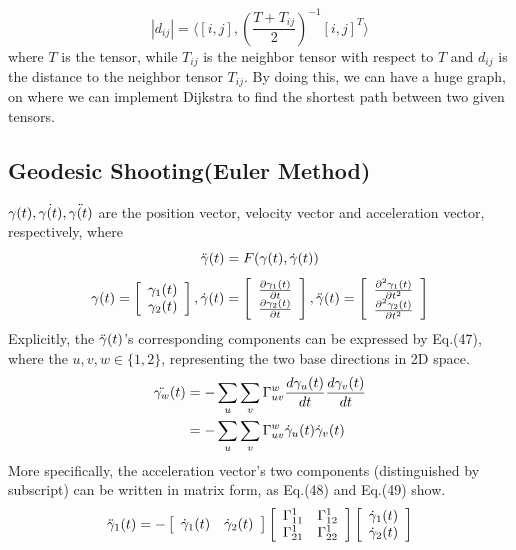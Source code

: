 \documentclass{article}
\theoremstyle{definition}
\theoremstyle{plain}
\begin{document}
\begin{equation}
    |d_{ij}|=\langle[i,j],\left(\frac{T+T_{ij}}{2}\right)^{-1}[i,j]^T\rangle
\end{equation}
where $T$ is the tensor, while $T_{ij}$ is the neighbor tensor with respect to $T$ and $d_{ij}$ is the distance to the neighbor tensor $T_{ij}$. By doing this, we can have a huge graph, on where we can implement Dijkstra to find the shortest path between two given tensors.

\subsection{Geodesic Shooting(Euler Method)}
$\gamma(t), \Dot{\gamma(t)}, \Ddot{\gamma(t)}$ are the position vector, velocity vector and acceleration vector, respectively, where
\begin{equation}
    \Ddot{\gamma}(t)=F(\gamma(t),\Dot{\gamma}(t))
\end{equation}
\begin{equation}
    \gamma(t)=\left[\begin{array}{c}
         \gamma_1(t) \\
         \gamma_2(t)
    \end{array}\right],
    \Dot{\gamma}(t)=\left[\begin{array}{c}
         \frac{\partial \gamma_1(t)}{\partial t} \\
         \frac{\partial \gamma_2(t)}{\partial t}
    \end{array}\right],
    \Ddot{\gamma}(t)=\left[\begin{array}{c}
         \frac{\partial^2\gamma_1(t)}{\partial t^2} \\
         \frac{\partial^2\gamma_2(t)}{\partial t^2}
    \end{array}\right]
\end{equation}
Explicitly, the $\Ddot{\gamma}(t)$'s corresponding components can be expressed by Eq.(47), where the $u, v, w\in\{1,2\}$, representing the two base directions in 2D space.
\begin{align}
    \Ddot{\gamma_w}(t)&=-\sum_u\sum_v\Gamma^w_{uv}\frac{d\gamma_u(t)}{dt}\frac{d\gamma_v(t)}{dt}\\ \nonumber
    &=-\sum_u\sum_v\Gamma^w_{uv}\Dot{\gamma}_u(t)\Dot{\gamma}_v(t)
\end{align}
More specifically, the acceleration vector's two components (distinguished by subscript) can be written in matrix form, as Eq.(48) and Eq.(49) show.
\begin{equation}
    \Ddot{\gamma}_1(t)=-\left[\begin{array}{cc}\Dot{\gamma}_1(t) & \Dot{\gamma}_2(t)\end{array}\right]
    \left[\begin{array}{cc}
        \Gamma^1_{11} & \Gamma^1_{12} \\
        \Gamma^1_{21} & \Gamma^1_{22}
    \end{array}\right]
    \left[\begin{array}{c}
         \Dot{\gamma}_1(t) \\
         \Dot{\gamma}_2(t)
    \end{array}\right]
\end{equation}
\end{document}
